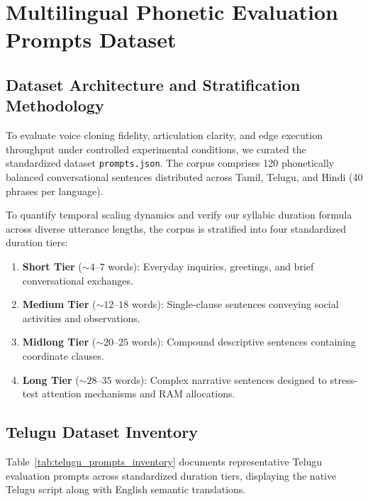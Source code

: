 \chapter{Multilingual Phonetic Evaluation Prompts Dataset}
\label{AppendixB}

\section{Dataset Architecture and Stratification Methodology}
To evaluate voice cloning fidelity, articulation clarity, and edge execution throughput under controlled experimental conditions, we curated the standardized dataset \texttt{prompts.json}. The corpus comprises 120 phonetically balanced conversational sentences distributed across Tamil, Telugu, and Hindi (40 phrases per language).

To quantify temporal scaling dynamics and verify our syllabic duration formula across diverse utterance lengths, the corpus is stratified into four standardized duration tiers:
\begin{enumerate}
    \item \textbf{Short Tier} ($\sim 4\text{--}7$ words): Everyday inquiries, greetings, and brief conversational exchanges.
    \item \textbf{Medium Tier} ($\sim 12\text{--}18$ words): Single-clause sentences conveying social activities and observations.
    \item \textbf{Midlong Tier} ($\sim 20\text{--}25$ words): Compound descriptive sentences containing coordinate clauses.
    \item \textbf{Long Tier} ($\sim 28\text{--}35$ words): Complex narrative sentences designed to stress-test attention mechanisms and RAM allocations.
\end{enumerate}

\section{Telugu Dataset Inventory}
Table~\ref{tab:telugu_prompts_inventory} documents representative Telugu evaluation prompts across standardized duration tiers, displaying the native Telugu script along with English semantic translations.

